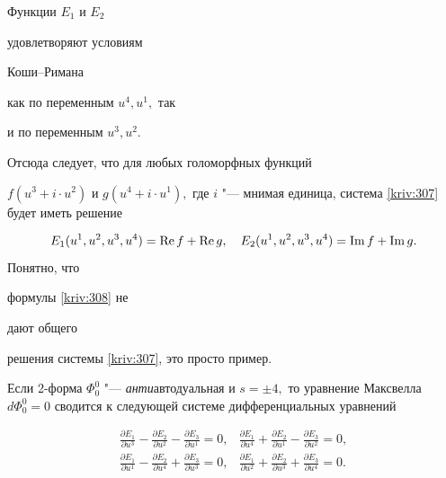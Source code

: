 Функции $E_{1}$ и $E_{2}$ 

удовлетворяют условиям 

Коши--Римана 

как по переменным $u^{4},u^{1},$ так 

и по переменным $u^{3},u^{2}.$ 

Отсюда следует,  что для любых голоморфных  функций 

$f( u^{3}+i\cdot u^{2}) $ и $g( u^{4}+i\cdot u^{1}) ,$ где $i$ "--- мнимая единица, система \eqref{kriv:307} будет иметь решение

\begin{equation}

E_{1}( u^{1},u^{2},u^{3},u^{4}) = \mathop{\rm Re}f+\mathop{\rm Re}g,\quad

E_{2}( u^{1},u^{2},u^{3},u^{4}) = \mathop{\rm Im}f+\mathop{\rm Im}g.

\label{kriv:308}

\end{equation}Понятно, что 

формулы \eqref{kriv:308} не 

дают общего 

решения системы \eqref{kriv:307}, это просто пример.



Если 2-форма $\Phi

_{0}^{0}$ "--- \textit{анти}автодуальная и $s=\pm 4,$ то уравнение Максвелла $d\Phi _{0}^{0}=0$ сводится к следующей системе дифференциальных уравнений

\begin{equation}

\begin{array}{ll}

\displaystyle

\frac{\partial E_{1}}{\partial u^{3}}-\frac{\partial E_{2}}{\partial u^{2}}-\frac{\partial E_{3}}{\partial u^{1}}=0,

& 

\displaystyle

\frac{\partial E_{1}}{\partial u^{4}}+\frac{\partial E_{2}}{\partial u^{1}}-\frac{\partial E_{3}}{\partial u^{2}}=0, \\[3mm] 

\displaystyle

\frac{\partial E_{1}}{\partial u^{1}}-\frac{\partial E_{2}}{\partial u^{4}}+\frac{\partial E_{3}}{\partial u^{3}}=0,

& 

\displaystyle

\frac{\partial E_{1}}{\partial u^{2}}+\frac{\partial E_{2}}{\partial u^{3}}+\frac{\partial E_{3}}{\partial u^{4}}=0.\end{array}

\label{kriv:309}

\end{equation}

